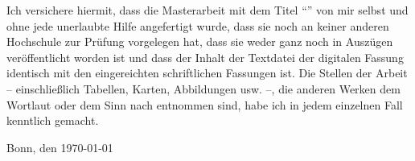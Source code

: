 \noindent Ich versichere hiermit, dass die Masterarbeit mit dem Titel \enquote{\mytitle} von mir selbst und ohne jede unerlaubte Hilfe angefertigt wurde, dass sie noch an keiner anderen Hochschule zur Prüfung vorgelegen hat, dass sie weder ganz noch in Auszügen veröffentlicht worden ist und dass der Inhalt der Textdatei der digitalen Fassung identisch mit den eingereichten schriftlichen Fassungen ist.
Die Stellen der Arbeit – einschließlich Tabellen, Karten, Abbildungen usw. –, die anderen Werken dem Wortlaut oder dem Sinn nach entnommen sind, habe ich in jedem einzelnen Fall kenntlich gemacht.

\vspace{3cm}
Bonn, den \today
